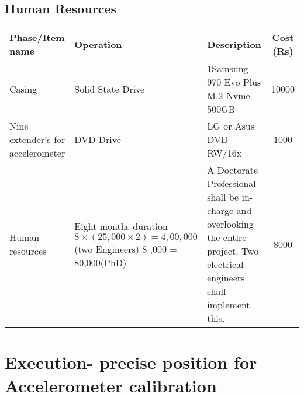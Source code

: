 \documentclass{FR16}
\begin{document}
\subsection{Human Resources}
\begin{center}
\begin{tabular}{||p{3 cm} ||p{4 cm}|| p{6 cm}|| c|| }
\arrayrulecolor{Azzurro}
\hline
\hline

{\bfseries Phase/Item name } & {\bfseries Operation}& {\bfseries Description} & {\bfseries Cost (Rs)} \\
\hline
\hline

Casing &Solid State Drive & 1Samsung 970 Evo Plus M.2 Nvme 500GB  & 10000\\
\hline
\hline
Nine extender's for accelerometer &DVD Drive & LG or Asus DVD-RW/16x & 1000\\
\hline
\hline
Human resources & \specialcell{Eight months duration \\$8\times (25,000 \times 2) =4,00,000$\\ (two Engineers)\\8 \times 10,000 = 80,000(PhD)}&  A Doctorate Professional shall be in-charge and overlooking the entire project. Two electrical engineers shall implement this. & 8000\\
\hline
\hline
\end{tabular}
\end{center}



\newpage



\section{Execution- precise position for Accelerometer calibration }



















 
\end{document}
